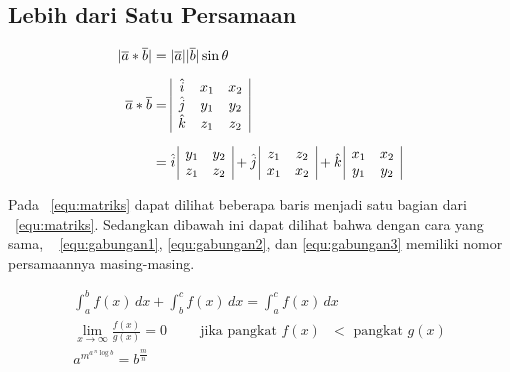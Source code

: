 \subsection{Lebih dari Satu Persamaan}
\label{sec:multiEqu}
\noindent \begin{align}\label{equ:matriks}
	|\overline{a} * \overline{b}| &= |\overline{a}| |\overline{b}| \sin\theta
	\\[0.2cm]
	\overline{a} * \overline{b} &=
	\begin{array}{| c c c |}
		\hat{i} & x_{1} & x_{2} \\
		\hat{j} & y_{1} & y_{2} \\
		\hat{k} & z_{1} & z_{2} \\
	\end{array} \nonumber \\[0.2cm]
	&= \hat{i} \,
	\begin{array}{ | c c | }
		y_{1} & y_{2} \\
		z_{1} & z_{2} \\
	\end{array}
	+ \hat{j} \,
	\begin{array}{ | c c | }
		z_{1} & z_{2} \\
		x_{1} & x_{2} \\
	\end{array}
	+ \hat{k} \,
	\begin{array}{ | c c | }
		x_{1} & x_{2} \\
		y_{1} & y_{2} \\
	\end{array}
	\nonumber
\end{align}

Pada \equ~\ref{equ:matriks} dapat dilihat beberapa baris menjadi satu bagian
dari \equ~\ref{equ:matriks}.
Sedangkan dibawah ini dapat dilihat bahwa dengan cara yang sama, \equ~
\ref{equ:gabungan1}, \ref{equ:gabungan2}, dan \ref{equ:gabungan3} memiliki nomor
persamaannya masing-masing.

\noindent \begin{align}\label{equ:gabungan1}
	\int_{a}^{b} f(x)\, dx + \int_{b}^{c} f(x) \, dx = \int_{a}^{c} f(x) \, dx
	\\\label{equ:gabungan2}
	\lim_{x \to \infty} \frac{f(x)}{g(x)} = 0 \hspace{1cm}
	\text{jika pangkat $f(x)$ $<$ pangkat $g(x)$} \\\label{equ:gabungan3}
	a^{m^{a \, ^{n}\log b }} = b^{\frac{m}{n}}
\end{align}



